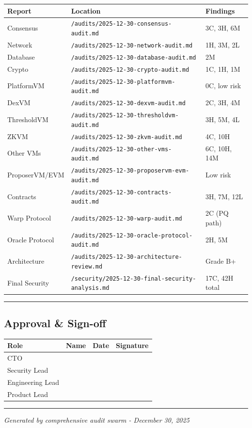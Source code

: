 \documentclass[
]{article}
\newcounter{none} %
\begin{document}
{\def\LTcaptype{none} %
\begin{longtable}[]{@{}lll@{}}
\toprule\noalign{}
Report & Location & Findings \\
\midrule\noalign{}
\endhead
\bottomrule\noalign{}
\endlastfoot
Consensus & \texttt{/audits/2025-12-30-consensus-audit.md} & 3C, 3H,
6M \\
Network & \texttt{/audits/2025-12-30-network-audit.md} & 1H, 3M, 2L \\
Database & \texttt{/audits/2025-12-30-database-audit.md} & 2M \\
Crypto & \texttt{/audits/2025-12-30-crypto-audit.md} & 1C, 1H, 1M \\
PlatformVM & \texttt{/audits/2025-12-30-platformvm-audit.md} & 0C, low
risk \\
DexVM & \texttt{/audits/2025-12-30-dexvm-audit.md} & 2C, 3H, 4M \\
ThresholdVM & \texttt{/audits/2025-12-30-thresholdvm-audit.md} & 3H, 5M,
4L \\
ZKVM & \texttt{/audits/2025-12-30-zkvm-audit.md} & 4C, 10H \\
Other VMs & \texttt{/audits/2025-12-30-other-vms-audit.md} & 6C, 10H,
14M \\
ProposerVM/EVM & \texttt{/audits/2025-12-30-proposervm-evm-audit.md} &
Low risk \\
Contracts & \texttt{/audits/2025-12-30-contracts-audit.md} & 3H, 7M,
12L \\
Warp Protocol & \texttt{/audits/2025-12-30-warp-audit.md} & 2C (PQ
path) \\
Oracle Protocol & \texttt{/audits/2025-12-30-oracle-protocol-audit.md} &
2H, 5M \\
Architecture & \texttt{/audits/2025-12-30-architecture-review.md} &
Grade B+ \\
Final Security &
\texttt{/security/2025-12-30-final-security-analysis.md} & 17C, 42H
total \\
\end{longtable}
}

\begin{center}\rule{0.5\linewidth}{0.5pt}\end{center}

\subsection{Approval \& Sign-off}\label{approval--sign-off}

{\def\LTcaptype{none} %
\begin{longtable}[]{@{}llll@{}}
\toprule\noalign{}
Role & Name & Date & Signature \\
\midrule\noalign{}
\endhead
\bottomrule\noalign{}
\endlastfoot
CTO & & & \\
Security Lead & & & \\
Engineering Lead & & & \\
Product Lead & & & \\
\end{longtable}
}

\begin{center}\rule{0.5\linewidth}{0.5pt}\end{center}

\emph{Generated by comprehensive audit swarm - December 30, 2025}
\end{document}

